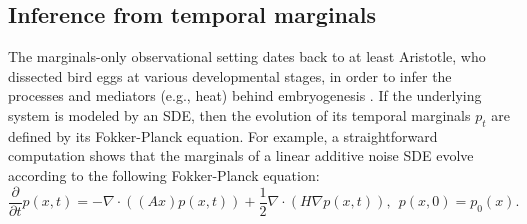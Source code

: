 \documentclass[twoside,11pt]{article}
\begin{document}







\subsection{Inference from temporal marginals}
The marginals-only observational setting dates back to at least Aristotle, who dissected bird eggs at various developmental stages, in order to infer the processes and mediators (e.g., heat) behind embryogenesis \citep{waddington1935animal,ogle1882aristotle,aristotle1942generation}. If the underlying system is modeled by an SDE, then the evolution of its temporal marginals $p_t$ are defined by its Fokker-Planck equation. For example, a straightforward computation shows that the marginals of a linear additive noise SDE evolve according to the following Fokker-Planck equation:
\begin{equation}
    \frac{\partial}{\partial t}p(x,t) = -\nabla \cdot \left((Ax) p(x,t)\right) + \frac{1}{2} \nabla \cdot (H \nabla p(x,t)), \ \ p(x,0)=p_0(x).
    \label{eq: FP_linear_additive_noise}
\end{equation}
\end{document}
